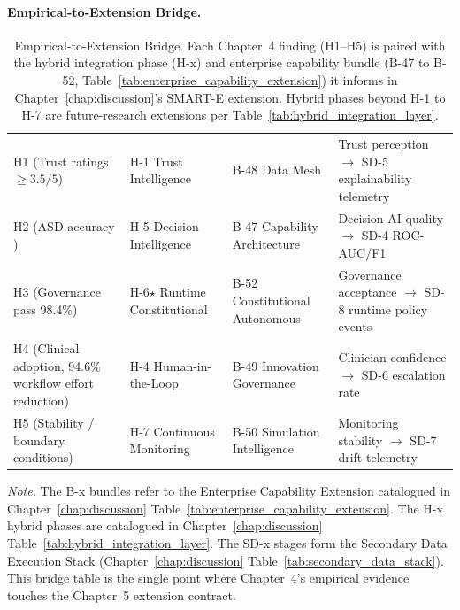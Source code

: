 \paragraph{Empirical-to-Extension Bridge.}
{\tablestripes\tablefontsize

\begin{xltabular}{\textwidth}{@{} >{\raggedright\arraybackslash}p{3.6cm} >{\raggedright\arraybackslash}p{3.2cm} >{\raggedright\arraybackslash}p{3.2cm} p{4.2cm} @{}}
\caption[Empirical-to-Extension Bridge]{Empirical-to-Extension Bridge. Each Chapter~4 finding (H1--H5) is paired with the hybrid integration phase (H-x) and enterprise capability bundle (B-47 to B-52, Table~\ref{tab:enterprise_capability_extension}) it informs in Chapter~\ref{chap:discussion}'s SMART-E extension. Hybrid phases beyond H-1 to H-7 are future-research extensions per Table~\ref{tab:hybrid_integration_layer}.}\label{tab:ch4_empirical_to_extension_bridge} \\
\toprule
{} &  &  &  \\
\midrule
\endfirsthead
\endhead
\bottomrule
\endlastfoot
H1 (Trust ratings $\geq 3.5/5$) & H-1 Trust Intelligence & B-48 Data Mesh & Trust perception $\to$ SD-5 explainability telemetry \\
H2 (ASD accuracy \asdacc{}) & H-5 Decision Intelligence & B-47 Capability Architecture & Decision-AI quality $\to$ SD-4 ROC-AUC/F1 \\
H3 (Governance pass 98.4\%) & H-6$\star$ Runtime Constitutional & B-52 Constitutional Autonomous & Governance acceptance $\to$ SD-8 runtime policy events \\
H4 (Clinical adoption, 94.6\% workflow effort reduction) & H-4 Human-in-the-Loop & B-49 Innovation Governance & Clinician confidence $\to$ SD-6 escalation rate \\
H5 (Stability / boundary conditions) & H-7 Continuous Monitoring & B-50 Simulation Intelligence & Monitoring stability $\to$ SD-7 drift telemetry \\
\end{xltabular}}
\vspace{0.5em}
\noindent\textit{Note.} The B-x bundles refer to the Enterprise Capability Extension catalogued in Chapter~\ref{chap:discussion} Table~\ref{tab:enterprise_capability_extension}. The H-x hybrid phases are catalogued in Chapter~\ref{chap:discussion} Table~\ref{tab:hybrid_integration_layer}. The SD-x stages form the Secondary Data Execution Stack (Chapter~\ref{chap:discussion} Table~\ref{tab:secondary_data_stack}). This bridge table is the single point where Chapter~4's empirical evidence touches the Chapter~5 extension contract.

